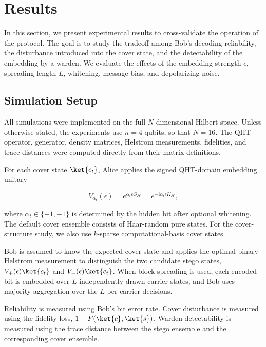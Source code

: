 \documentclass[11pt]{article}
\theoremstyle{plain}
\theoremstyle{definition}
\theoremstyle{remark}
\begin{document}
\section{Results}
\label{Sec:Results}

In this section, we present experimental results to cross-validate the operation of the protocol. The goal is to study the tradeoff among Bob's decoding reliability, the disturbance introduced into the cover state, and the detectability of the embedding by a warden. We evaluate the effects of the embedding strength $\epsilon$, spreading length $L$, whitening, message bias, and depolarizing noise.

\subsection{Simulation Setup}
\label{Sec:setup}

All simulations were implemented on the full $N$-dimensional Hilbert space. Unless otherwise stated, the experiments use $n=4$ qubits, so that $N=16$. The QHT operator, generator, density matrices, Helstrom measurements, fidelities, and trace distances were computed directly from their matrix definitions.

For each cover state $\ket{c_t}$, Alice applies the signed QHT-domain embedding unitary

\begin{equation}
V_{\alpha_t}(\epsilon)
=
e^{\alpha_t\epsilon G_{\mathcal H}}
=
e^{-\mathrm{i}\alpha_t\epsilon K_{\mathcal H}},
\end{equation}

where $\alpha_t\in\{+1,-1\}$ is determined by the hidden bit after optional whitening. The default cover ensemble consists of Haar-random pure states. For the cover-structure study, we also use $k$-sparse computational-basis cover states.

Bob is assumed to know the expected cover state and applies the optimal binary Helstrom measurement to distinguish the two candidate stego states,
$V_{+}(\epsilon)\ket{c_t}$ and $V_{-}(\epsilon)\ket{c_t}$. When block spreading is used, each encoded bit is embedded over $L$ independently drawn carrier states, and Bob uses majority aggregation over the $L$ per-carrier decisions.

Reliability is measured using Bob's bit error rate. Cover disturbance is measured using the fidelity loss,
$1-F(\ket{c},\ket{s})$. Warden detectability is measured using the trace distance between the stego ensemble and the corresponding cover ensemble.
\end{document}

